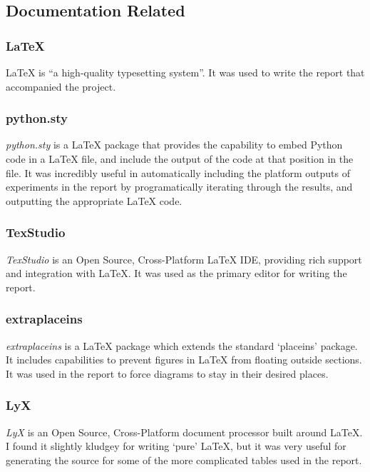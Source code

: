 \documentclass[a4paper,11pt]{report}
\begin{document}
\subsection{Documentation Related}

\subsubsection*{\LaTeX{}}
\LaTeX{} \citep{prog:latex} is ``a high-quality typesetting system''. It was used to write the report that accompanied the project.

\subsubsection*{python.sty}
\emph{python.sty} \citep{prog:pythonsty} is a \LaTeX{} package that provides the capability to embed Python code in a \LaTeX{} file, and include the output of the code at that position in the file. It was incredibly useful in automatically including the platform outputs of experiments in the report by programatically iterating through the results, and outputting the appropriate \LaTeX{} code.

\subsubsection*{TexStudio}
\emph{TexStudio} \citep{prog:texstudio} is an Open Source, Cross-Platform \LaTeX{} IDE, providing rich support and integration with \LaTeX{}. It was used as the primary editor for writing the report.

\subsubsection*{extraplaceins}
\emph{extraplaceins} \citep{prog:extraplaceins} is a \LaTeX{} package which extends the standard `placeins' package. It includes capabilities to prevent figures in \LaTeX{} from floating outside sections. It was used in the report to force diagrams to stay in their desired places.

\subsubsection*{LyX}
\emph{LyX} \citep{prog:lyx} is an Open Source, Cross-Platform document processor built around \LaTeX{}. I found it slightly kludgey for writing `pure' \LaTeX{}, but it was very useful for generating the source for some of the more complicated tables used in the report. 
\end{document}
